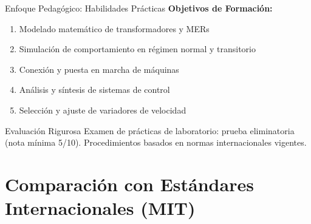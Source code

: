 \documentclass[aspectratio=43]{beamer}
\begin{document}
  \begin{frame}{Enfoque Pedagógico: Habilidades Prácticas}
  \textbf{Objetivos de Formación:}
  \begin{enumerate}
  \item Modelado matemático de transformadores y MERs
  \item Simulación de comportamiento en régimen normal y transitorio
  \item Conexión y puesta en marcha de máquinas
  \item Análisis y síntesis de sistemas de control
  \item Selección y ajuste de variadores de velocidad
  \end{enumerate}
  
  \vspace{0.3cm}
  
  \begin{alertblock}{Evaluación Rigurosa}
  Examen de prácticas de laboratorio: prueba eliminatoria (nota mínima 5/10). Procedimientos basados en normas internacionales vigentes.
  \end{alertblock}
  
  \end{frame}
  
  \section{Comparación con Estándares Internacionales (MIT)}
  
\end{document}
